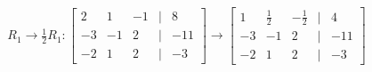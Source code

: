 \documentclass[preview]{standalone}
\begin{document}
\begin{align*}
R_1 \rightarrow \frac{1}{2}R_1: \begin{bmatrix} 2 & 1 & -1 & | & 8 \\ -3 & -1 & 2 & | & -11 \\ -2 & 1 & 2 & | & -3 \end{bmatrix} \rightarrow \begin{bmatrix} 1 & \frac{1}{2} & -\frac{1}{2} & | & 4 \\ -3 & -1 & 2 & | & -11 \\ -2 & 1 & 2 & | & -3 \end{bmatrix}
\end{align*}
\end{document}
